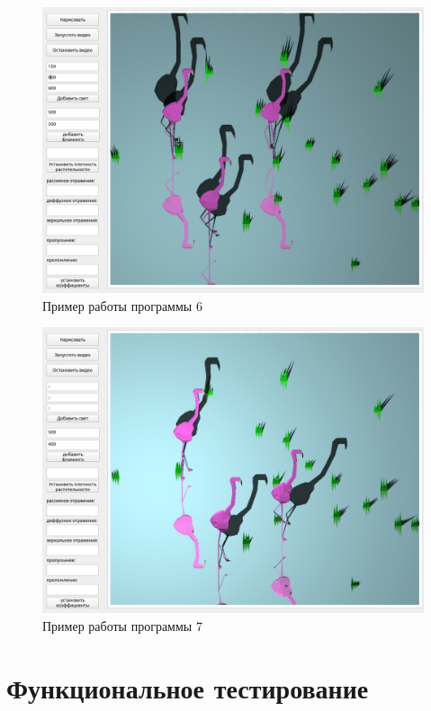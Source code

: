 \begin{figure}[h!]
	\centering
	\includegraphics[width=0.9\linewidth]{img/ex7}
	\caption{Пример работы программы 6}
	\label{fig:ex6}
\end{figure}

\begin{figure}[h!]
	\centering
	\includegraphics[width=0.9\linewidth]{img/ex6}
	\caption{Пример работы программы 7}
	\label{fig:ex7}
\end{figure}
\clearpage

\section{Функциональное тестирование}

